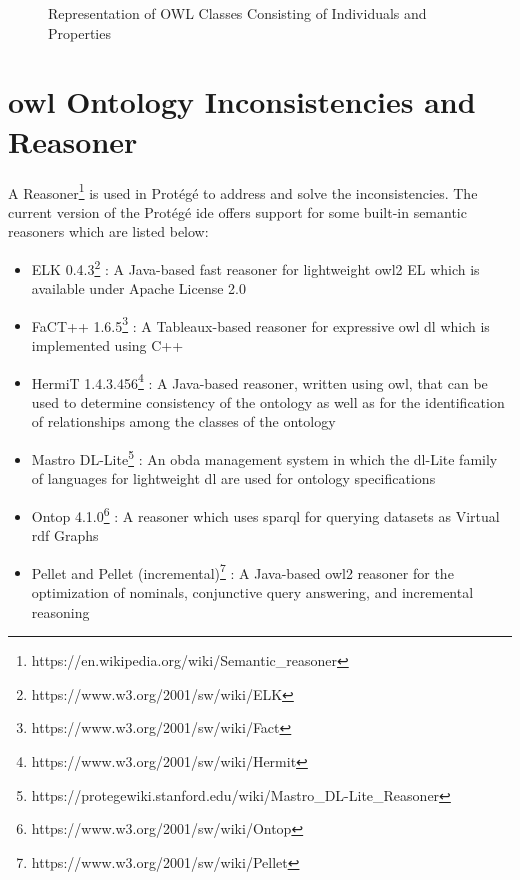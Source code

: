 \begin{doublespace}
\begin{itemize}
\begin{figure}[htp]
    \caption{Representation of OWL Classes Consisting of Individuals and Properties}
    \label{fig:3.3}
\end{figure}
\end{itemize}
\section{\ac{owl} Ontology Inconsistencies and Reasoner}
\par A Reasoner\footnote{https://en.wikipedia.org/wiki/Semantic\_reasoner} is used in Protégé to address and solve the inconsistencies. The current version of the Protégé \ac{ide} offers support for some built-in semantic reasoners which are listed below: 
\begin{itemize}
    \item ELK 0.4.3\footnote{https://www.w3.org/2001/sw/wiki/ELK} : A Java-based fast reasoner for lightweight \ac{owl}2 EL which is available under Apache License 2.0
    \item FaCT++ 1.6.5\footnote{https://www.w3.org/2001/sw/wiki/Fact} : A Tableaux-based reasoner for expressive \ac{owl} \ac{dl} which is implemented using C++
    \item HermiT 1.4.3.456\footnote{https://www.w3.org/2001/sw/wiki/Hermit} : A Java-based reasoner, written using \ac{owl}, that can be used to determine consistency of the ontology as well as for the identification of relationships among the classes of the ontology
    \item Mastro DL-Lite\footnote{https://protegewiki.stanford.edu/wiki/Mastro\_DL-Lite\_Reasoner} : An \ac{obda} management system in which the \ac{dl}-Lite family of languages for lightweight \ac{dl} are used for ontology specifications
    \item Ontop 4.1.0\footnote{https://www.w3.org/2001/sw/wiki/Ontop} : A reasoner which uses \ac{sparql} for querying datasets as Virtual \ac{rdf} Graphs
    \item Pellet and Pellet (incremental)\footnote{https://www.w3.org/2001/sw/wiki/Pellet} : A Java-based \ac{owl}2 reasoner for the optimization of nominals, conjunctive query answering, and incremental reasoning
\end{itemize}

\end{doublespace}